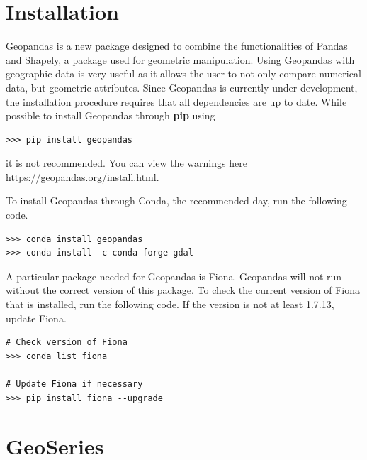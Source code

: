 



\section*{Installation} %
Geopandas is a new package designed to combine the functionalities of Pandas and Shapely, a package used for geometric manipulation.
Using Geopandas with geographic data is very useful as it allows the user to not only compare numerical data, but geometric attributes.
Since Geopandas is currently under development, the installation procedure requires that all dependencies are up to date.
While possible to install Geopandas through \textbf{pip} using

\begin{lstlisting}
>>> pip install geopandas
\end{lstlisting}


it is not recommended.
You can view the warnings here \url{https://geopandas.org/install.html}.

To install Geopandas through Conda, the recommended day, run the following code.

\begin{lstlisting}
>>> conda install geopandas
>>> conda install -c conda-forge gdal
\end{lstlisting}

A particular package needed for Geopandas is Fiona.
Geopandas will not run without the correct version of this package.
To check the current version of Fiona that is installed, run the following code.
If the version is not at least 1.7.13, update Fiona.

\begin{lstlisting}
# Check version of Fiona
>>> conda list fiona

# Update Fiona if necessary
>>> pip install fiona --upgrade
\end{lstlisting}

\section*{GeoSeries} %

